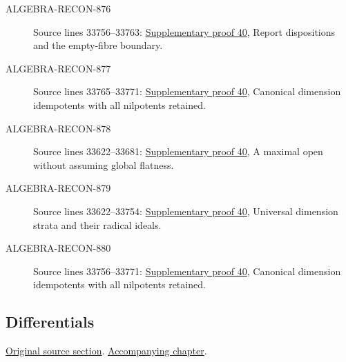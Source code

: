 \begin{description}
\item[ALGEBRA-RECON-876] Source lines 33756--33763: \hyperlink{algebra_cm_open_notes_20260928}{Supplementary proof 40}, Report dispositions and the empty-fibre boundary.
\item[ALGEBRA-RECON-877] Source lines 33765--33771: \hyperlink{algebra_cm_open_notes_20260928}{Supplementary proof 40}, Canonical dimension idempotents with all nilpotents retained.
\item[ALGEBRA-RECON-878] Source lines 33622--33681: \hyperlink{algebra_cm_open_notes_20260928}{Supplementary proof 40}, A maximal open without assuming global flatness.
\item[ALGEBRA-RECON-879] Source lines 33622--33754: \hyperlink{algebra_cm_open_notes_20260928}{Supplementary proof 40}, Universal dimension strata and their radical ideals.
\item[ALGEBRA-RECON-880] Source lines 33756--33771: \hyperlink{algebra_cm_open_notes_20260928}{Supplementary proof 40}, Canonical dimension idempotents with all nilpotents retained.
\end{description}

\subsection{Differentials}
\hypertarget{algebra-source-section-differentials}{}
\noindent\href{https://github.com/stacks/stacks-project/blob/a04446e57ec1fbc252a871afcec7752fb2807b14/algebra.tex\#L33788}{Original source section}. \href{algebra.pdf\#nameddest=section-differentials}{Accompanying chapter}.

